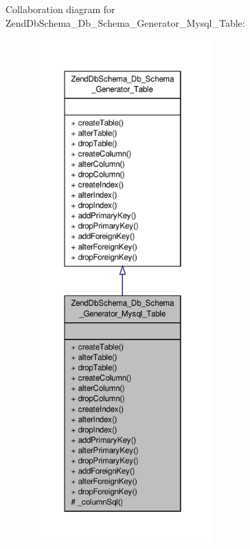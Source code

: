 Collaboration diagram for Zend\-Db\-Schema\-\_\-\-Db\-\_\-\-Schema\-\_\-\-Generator\-\_\-\-Mysql\-\_\-\-Table\-:\nopagebreak
\begin{figure}[H]
\begin{center}
\leavevmode
\includegraphics[height=550pt]{classZendDbSchema__Db__Schema__Generator__Mysql__Table__coll__graph}
\end{center}
\end{figure}
